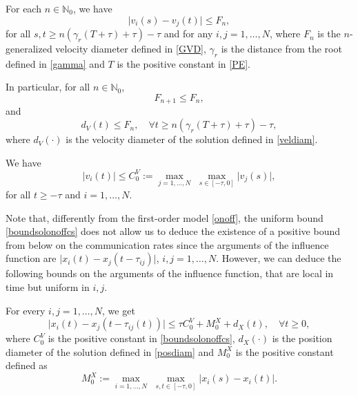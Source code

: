 \documentclass[11pt]{article}
\begin{document}
\begin{lem}\label{lemmadiamonoffcs}
	For each $n\in \mathbb{N}_0$, we have 
	\begin{equation}\label{diamonoffcs}
		\lvert v_i(s)-v_j(t)\rvert\leq F_n,
	\end{equation}
	for all  $s,t\geq n(\gamma_r (T+\tau)+\tau)-\tau$ and for any $i,j=1,\dots,N$, where $F_n$ is the $n$-generalized velocity diameter defined in \eqref{GVD}, $\gamma_r$ is the distance from the root defined in \eqref{gamma} and $T$ is the positive constant in \eqref{PE}.
	
	In particular, for all $n\in \mathbb{N}_0$, 	
	\begin{equation}\label{Fndec}
		F_{n+1}\leq F_n,
	\end{equation}
	and
	\begin{equation}\label{diamonoff2cs}
		d_V(t)\leq F_n,\quad \forall t\geq n(\gamma_r (T+\tau)+\tau)-\tau,
	\end{equation}
	where $d_V(\cdot)$ is the {velocity} diameter of the solution defined in \eqref{veldiam}.
\end{lem}
\begin{lem}\label{L3onoffcs}
	We have \begin{equation}\label{boundsolonoffcs}
		\lvert v_{i}(t)\rvert\leq C^V_{0}:=\max_{j=1,\dots,N}\,\,\max_{s\in [-\tau, 0]}\lvert v_{j}(s)\rvert,
	\end{equation}
	for all $t\geq -\tau$ and $i=1,\dots,N$. 
\end{lem}
	Note that, differently from the first-order model \eqref{onoff}, the uniform bound \eqref{boundsolonoffcs} does not allow us to deduce the existence of a positive bound from below on the communication rates since the arguments of the influence function are $\lvert x_i(t)-x_{j}(t-\tau_{ij})\rvert$, $i,j=1,\dots,N$. However, we can deduce the following bounds on the arguments of the influence function, that are local in time but uniform in $i,j$.
	\begin{lem}\label{lemmacs}
		For every $i,j=1,\dots,N$, we get
		\begin{equation}\label{dist}
			\lvert x_{i}(t)-x_{j}(t-\tau_{ij}(t))\rvert\leq \tau C_{0}^{V}+M^{X}_{0}+d_{X}(t), \quad\forall t\geq0,
		\end{equation}
		where $C_{0}^{V}$ is the positive constant in \eqref{boundsolonoffcs}, $d_X(\cdot)$ is the position diameter of the solution defined in \eqref{posdiam} and $M^{X}_{0}$ is the positive constant defined as
        \begin{equation}\label{M_0}
        	M_0^{X}:=\max_{i=1,\dots,N}\,\,\max_{s,t\in [-\tau,0]}\lvert x_{i}(s)-x_i(t)\rvert.
        \end{equation}       
	\end{lem}
\end{document}
